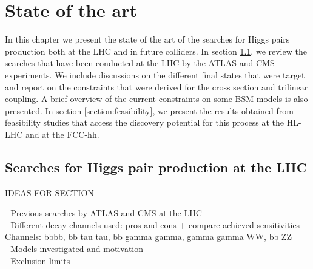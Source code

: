
\chapter{State of the art}
\label{chapter:state}

In this chapter we present the state of the art of the searches for Higgs pairs production both at the LHC and in future colliders. In section \ref{section:previous_searches}, we review the searches that have been conducted at the LHC by the ATLAS and CMS experiments. We include discussions on the different final states that were target and report on the constraints that were derived for the cross section and trilinear coupling. A brief overview of the current constraints on some BSM models is also presented. In section \ref{section:feasibility}, we present the results obtained from feasibility studies that access the discovery potential for this process at the HL-LHC and at the FCC-hh.

\section{Searches for Higgs pair production at the LHC}
\label{section:previous_searches}

IDEAS FOR SECTION

- Previous searches by ATLAS and CMS at the LHC \checkmark\\
- Different decay channels used: pros and cons + compare achieved sensitivities \checkmark \\
Channels: bbbb, bb tau tau, bb gamma gamma, gamma gamma WW, bb ZZ \checkmark \\
- Models investigated and motivation \\
- Exclusion limits

